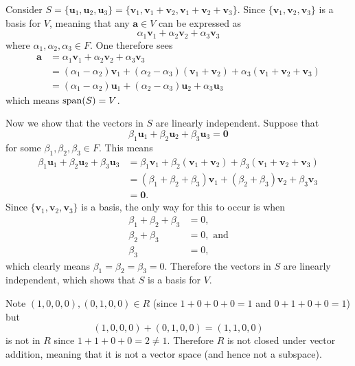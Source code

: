 \begin{questions}
    \item Consider $S = \{\textbf{u}_1, \textbf{u}_2, \textbf{u}_3\} = \{\textbf{v}_1, \textbf{v}_1 + \textbf{v}_2, \textbf{v}_1 + \textbf{v}_2 + \textbf{v}_3\}$. Since $\{\textbf{v}_1,\textbf{v}_2,\textbf{v}_3\}$ is a basis for $V$, meaning that any $\textbf{a} \in V$ can be expressed as
    \[
        \alpha_1\textbf{v}_1 + \alpha_2\textbf{v}_2 + \alpha_3\textbf{v}_3
    \]
    where $\alpha_1, \alpha_2, \alpha_3 \in F$. One therefore sees
    \begin{align*}
        \textbf{a} &= \alpha_1\textbf{v}_1 + \alpha_2\textbf{v}_2 + \alpha_3\textbf{v}_3\\
        &= (\alpha_1 - \alpha_2)\textbf{v}_1 + (\alpha_2 - \alpha_3)(\textbf{v}_1 + \textbf{v}_2) + \alpha_3(\textbf{v}_1 + \textbf{v}_2 + \textbf{v}_3)\\
        &= (\alpha_1 - \alpha_2)\textbf{u}_1 + (\alpha_2 - \alpha_3)\textbf{u}_2 + \alpha_3\textbf{u}_3
    \end{align*}
    which means $\mathrm{span}(S) = V$.

    Now we show that the vectors in $S$ are linearly independent. Suppose that
    \[
        \beta_1\textbf{u}_1 + \beta_2\textbf{u}_2 + \beta_3\textbf{u}_3 = \textbf{0}
    \]
    for some $\beta_1, \beta_2, \beta_3 \in F$. This means
    \begin{align*}
        \beta_1\textbf{u}_1 + \beta_2\textbf{u}_2 + \beta_3\textbf{u}_3 &= \beta_1\textbf{v}_1 + \beta_2(\textbf{v}_1 + \textbf{v}_2) + \beta_3(\textbf{v}_1 + \textbf{v}_2 + \textbf{v}_3)\\
        &= (\beta_1+\beta_2+\beta_3)\textbf{v}_1 + (\beta_2+\beta_3)\textbf{v}_2 + \beta_3\textbf{v}_3\\
        &= \textbf{0}.
    \end{align*}
    Since $\{\textbf{v}_1, \textbf{v}_2, \textbf{v}_3\}$ is a basis, the only way for this to occur is when
    \begin{align*}
        \beta_1 + \beta_2 + \beta_3 &= 0,\\
        \beta_2 + \beta_3 &= 0, \text{ and}\\
        \beta_3 & = 0,
    \end{align*}
    which clearly means $\beta_1 = \beta_2 = \beta_3 = 0$. Therefore the vectors in $S$ are linearly independent, which shows that $S$ is a basis for $V$.

    \item \begin{partquestions}{\alph*}
        \item Note $(1, 0, 0, 0), (0, 1, 0, 0) \in R$ (since $1 + 0 + 0 + 0 = 1$ and $0 + 1 + 0 + 0 = 1$) but
        \[
            (1, 0, 0, 0) + (0, 1, 0, 0) = (1, 1, 0, 0)
        \]
        is not in $R$ since $1 + 1 + 0 + 0 = 2 \neq 1$. Therefore $R$ is not closed under vector addition, meaning that it is not a vector space (and hence not a subspace).


\end{partquestions}
\end{questions}
